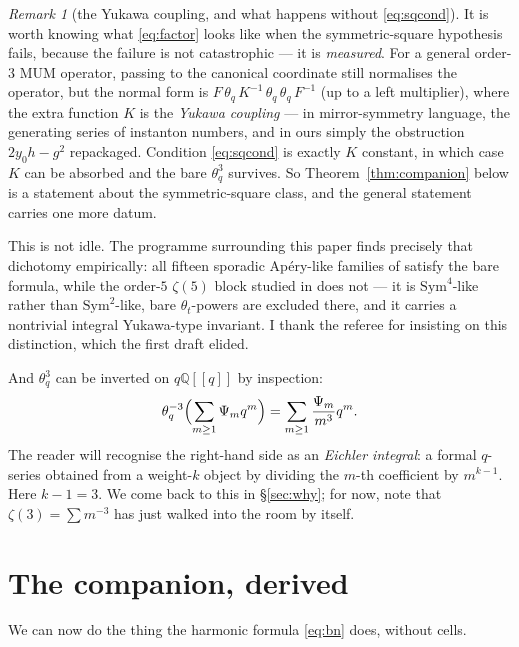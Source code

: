 \documentclass[11pt,reqno]{amsart}
\theoremstyle{plain}
\theoremstyle{definition}
\theoremstyle{remark}
\newtheorem{remark}[theorem]{Remark}
\newcommand{\Q}{\mathbb{Q}}
\newcommand{\ta}{\theta_t}
\newcommand{\tq}{\theta_q}
\numberwithin{equation}{section}
\begin{document}
\begin{remark}[the Yukawa coupling, and what happens without \eqref{eq:sqcond}]
\label{rem:yukawa}
It is worth knowing what \eqref{eq:factor} looks like when the symmetric-square
hypothesis fails, because the failure is not catastrophic --- it is
\emph{measured}. For a general order-$3$ MUM operator, passing to the canonical
coordinate still normalises the operator, but the normal form is
$F\,\tq\,K^{-1}\,\tq\,\tq\,F^{-1}$ (up to a left multiplier), where the extra
function $K$ is the \emph{Yukawa coupling} --- in mirror-symmetry language, the
generating series of instanton numbers, and in ours simply the obstruction
$2y_0h-g^2$ repackaged. Condition \eqref{eq:sqcond} is exactly $K$ constant, in
which case $K$ can be absorbed and the bare $\tq^3$ survives. So
Theorem~\ref{thm:companion} below is a statement about the symmetric-square
class, and the general statement carries one more datum.

This is not idle. The programme surrounding this paper finds precisely that
dichotomy empirically: all fifteen sporadic Ap\'ery-like families of
\cite{Zagier09,ASZ,Cooper} satisfy the bare formula, while the order-$5$
$\zeta(5)$ block studied in \cite{RepoZ5} does not --- it is $\mathrm{Sym}^4$-like
rather than $\mathrm{Sym}^2$-like, bare $\ta$-powers are excluded there, and it
carries a nontrivial integral Yukawa-type invariant. I thank the referee for
insisting on this distinction, which the first draft elided.
\end{remark}

And $\tq^3$ can be inverted on $q\Q[[q]]$ by inspection:
\begin{equation}\label{eq:thetainv}
  \tq^{-3}\Bigl(\sum_{m\ge1}\Psi_mq^m\Bigr)=\sum_{m\ge1}\frac{\Psi_m}{m^3}q^m .
\end{equation}
The reader will recognise the right-hand side as an \emph{Eichler integral}: a
formal $q$-series obtained from a weight-$k$ object by dividing the $m$-th
coefficient by $m^{k-1}$. Here $k-1=3$. We come back to this in \S\ref{sec:why};
for now, note that $\zeta(3)=\sum m^{-3}$ has just walked into the room by
itself.

\section{The companion, derived}\label{sec:punchline}

We can now do the thing the harmonic formula \eqref{eq:bn} does, without cells.
\end{document}
